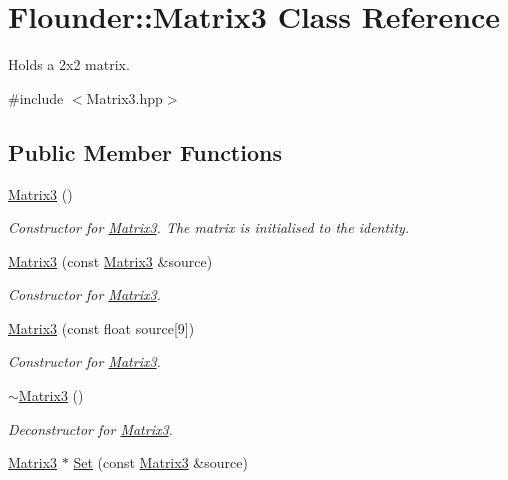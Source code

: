 \hypertarget{class_flounder_1_1_matrix3}{}\section{Flounder\+:\+:Matrix3 Class Reference}
\label{class_flounder_1_1_matrix3}


Holds a 2x2 matrix.  




{\ttfamily \#include $<$Matrix3.\+hpp$>$}

\subsection*{Public Member Functions}
\begin{DoxyCompactItemize}
\item 
\hyperlink{class_flounder_1_1_matrix3_a45f191f16267632ec7595af5643d6717}{Matrix3} ()
\begin{DoxyCompactList}\small\item\em Constructor for \hyperlink{class_flounder_1_1_matrix3}{Matrix3}. The matrix is initialised to the identity. \end{DoxyCompactList}\item 
\hyperlink{class_flounder_1_1_matrix3_a72297b2c1559f883cb4839479fd76b26}{Matrix3} (const \hyperlink{class_flounder_1_1_matrix3}{Matrix3} \&source)
\begin{DoxyCompactList}\small\item\em Constructor for \hyperlink{class_flounder_1_1_matrix3}{Matrix3}. \end{DoxyCompactList}\item 
\hyperlink{class_flounder_1_1_matrix3_ad6cfcaeda99aa028ea5f81fe7c6bcbc2}{Matrix3} (const float source\mbox{[}9\mbox{]})
\begin{DoxyCompactList}\small\item\em Constructor for \hyperlink{class_flounder_1_1_matrix3}{Matrix3}. \end{DoxyCompactList}\item 
\hyperlink{class_flounder_1_1_matrix3_aefb483862a51bd5806cbba551cca964e}{$\sim$\+Matrix3} ()
\begin{DoxyCompactList}\small\item\em Deconstructor for \hyperlink{class_flounder_1_1_matrix3}{Matrix3}. \end{DoxyCompactList}\item 
\hyperlink{class_flounder_1_1_matrix3}{Matrix3} $\ast$ \hyperlink{class_flounder_1_1_matrix3_a639a139ec25eff86cb36c81a11f89419}{Set} (const \hyperlink{class_flounder_1_1_matrix3}{Matrix3} \&source)

\end{DoxyCompactItemize}
